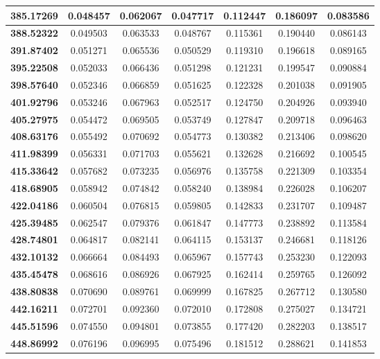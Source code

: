 \documentclass[10pt, a4paper]{article}
\begin{document}
\begin{appendices}
\begin{longtable}{|c|c|c|c|c|c|c|}
	\textbf{385.17269} & 0.048457 & 0.062067 & 0.047717 & 0.112447 & 0.186097 & 0.083586 \\ \hline
	\textbf{388.52322} & 0.049503 & 0.063533 & 0.048767 & 0.115361 & 0.190440 & 0.086143 \\ \hline
	\textbf{391.87402} & 0.051271 & 0.065536 & 0.050529 & 0.119310 & 0.196618 & 0.089165 \\ \hline
	\textbf{395.22508} & 0.052033 & 0.066436 & 0.051298 & 0.121231 & 0.199547 & 0.090884 \\ \hline
	\textbf{398.57640} & 0.052346 & 0.066859 & 0.051625 & 0.122328 & 0.201038 & 0.091905 \\ \hline
	\textbf{401.92796} & 0.053246 & 0.067963 & 0.052517 & 0.124750 & 0.204926 & 0.093940 \\ \hline
	\textbf{405.27975} & 0.054472 & 0.069505 & 0.053749 & 0.127847 & 0.209718 & 0.096463 \\ \hline
	\textbf{408.63176} & 0.055492 & 0.070692 & 0.054773 & 0.130382 & 0.213406 & 0.098620 \\ \hline
	\textbf{411.98399} & 0.056331 & 0.071703 & 0.055621 & 0.132628 & 0.216692 & 0.100545 \\ \hline
	\textbf{415.33642} & 0.057682 & 0.073235 & 0.056976 & 0.135758 & 0.221309 & 0.103354 \\ \hline
	\textbf{418.68905} & 0.058942 & 0.074842 & 0.058240 & 0.138984 & 0.226028 & 0.106207 \\ \hline
	\textbf{422.04186} & 0.060504 & 0.076815 & 0.059805 & 0.142833 & 0.231707 & 0.109487 \\ \hline
	\textbf{425.39485} & 0.062547 & 0.079376 & 0.061847 & 0.147773 & 0.238892 & 0.113584 \\ \hline
	\textbf{428.74801} & 0.064817 & 0.082141 & 0.064115 & 0.153137 & 0.246681 & 0.118126 \\ \hline
	\textbf{432.10132} & 0.066664 & 0.084493 & 0.065967 & 0.157743 & 0.253230 & 0.122093 \\ \hline
	\textbf{435.45478} & 0.068616 & 0.086926 & 0.067925 & 0.162414 & 0.259765 & 0.126092 \\ \hline
	\textbf{438.80838} & 0.070690 & 0.089761 & 0.069999 & 0.167825 & 0.267712 & 0.130580 \\ \hline
	\textbf{442.16211} & 0.072701 & 0.092360 & 0.072010 & 0.172808 & 0.275027 & 0.134721 \\ \hline
	\textbf{445.51596} & 0.074550 & 0.094801 & 0.073855 & 0.177420 & 0.282203 & 0.138517 \\ \hline
	\textbf{448.86992} & 0.076196 & 0.096995 & 0.075496 & 0.181512 & 0.288621 & 0.141853 \\ \hline

\end{longtable}
\end{appendices}
\end{document}
